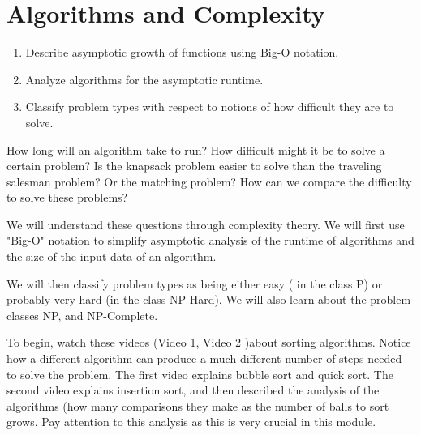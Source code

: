 
%

\chapter{Algorithms and Complexity}

\label{sec:complexity}
\begin{outcome}
\begin{enumerate}
\item Describe asymptotic growth of functions using Big-O notation.
\item Analyze algorithms for the asymptotic runtime.
\item Classify problem types with respect to notions of how difficult they are to solve.
\end{enumerate}
\end{outcome}

How long will an algorithm take to run?   How difficult might it be to solve a certain problem?   Is the knapsack problem easier to solve than the traveling salesman problem?  Or the matching problem?  
How can we compare the difficulty to solve these problems?

 

We will understand these questions through complexity theory.   We will first use "Big-O" notation to simplify asymptotic analysis of the runtime of algorithms and the size of the input data of an algorithm.  

We will then classify problem types as being either easy ( in the class P) or probably very hard (in the class NP Hard).  We will also learn about the problem classes NP, and NP-Complete.  

To begin, watch these videos (\href{https://www.youtube.com/watch?v=aXXWXz5rF64}{Video 1}, \href{https://youtu.be/TZRWRjq2CAg}{Video 2} )about sorting algorithms.  Notice how a different algorithm can produce a much different number of steps needed to solve the problem.  The first video explains bubble sort and quick sort. The second video explains insertion sort, and then described the analysis of the algorithms (how many comparisons they make as the number of balls to sort grows.    Pay attention to this analysis as this is very crucial in this module.

